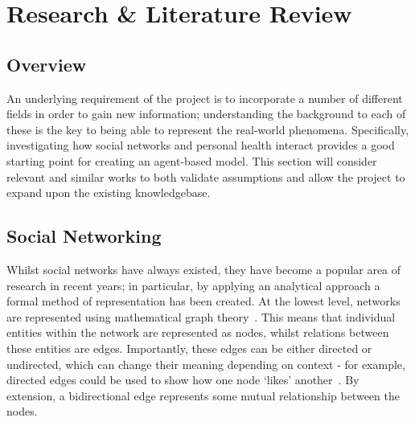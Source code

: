 \documentclass[]{report}
\begin{document}
%
%
\chapter{Research \& Literature Review}
\label{sec:litrev}
\section{Overview}
An underlying requirement of the project is to incorporate a number of different fields in order to gain new information; understanding the background to each of these is the key to being able to represent the real-world phenomena. Specifically, investigating how social networks and personal health interact provides a good starting point for creating an agent-based model. This section will consider relevant and similar works to both validate assumptions and allow the project to expand upon the existing knowledgebase.

\section{Social Networking}
\label{sec:litrev-socnet}
Whilst social networks have always existed, they have become a popular area of research in recent years; in particular, by applying an analytical approach a formal method of representation has been created. At the lowest level, networks are represented using mathematical graph theory~\cite{NetMark-21}. This means that individual entities within the network are represented as nodes, whilst relations between these entities are edges. Importantly, these edges can be either directed or undirected, which can change their meaning depending on context - for example, directed edges could be used to show how one node `likes' another~\cite{USN-14}. By extension, a bidirectional edge represents some mutual relationship between the nodes.
\end{document}

